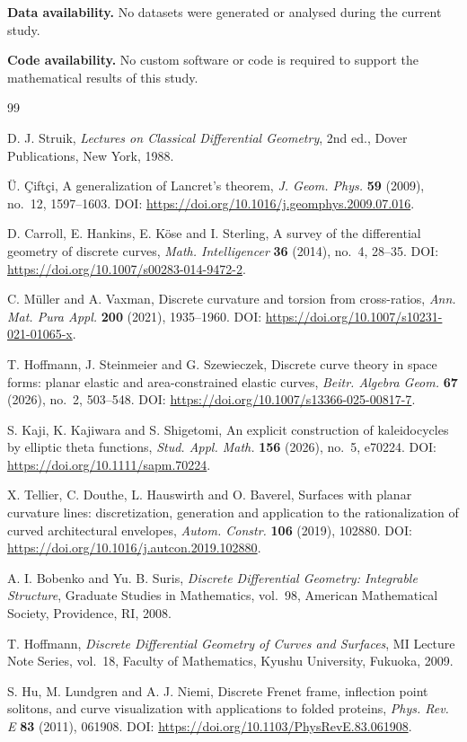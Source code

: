 \documentclass[10pt,a4paper]{amsart}
\theoremstyle{definition}
\theoremstyle{remark}
\numberwithin{equation}{section}
\begin{document}
\medskip
\noindent\textbf{Data availability.}
No datasets were generated or analysed during the current study.

\medskip
\noindent\textbf{Code availability.}
No custom software or code is required to support the mathematical results of this study.

\bigskip
\begin{sloppypar}
\begin{thebibliography}{99}

D. J. Struik,
\emph{Lectures on Classical Differential Geometry}, 2nd ed.,
Dover Publications, New York, 1988.

\"U. \c{C}ift\c{c}i,
A generalization of Lancret's theorem,
\emph{J. Geom. Phys.} \textbf{59} (2009), no.~12, 1597--1603.
DOI: \url{https://doi.org/10.1016/j.geomphys.2009.07.016}.

D. Carroll, E. Hankins, E. K\"ose and I. Sterling,
A survey of the differential geometry of discrete curves,
\emph{Math. Intelligencer} \textbf{36} (2014), no.~4, 28--35.
DOI: \url{https://doi.org/10.1007/s00283-014-9472-2}.

C. M\"uller and A. Vaxman,
Discrete curvature and torsion from cross-ratios,
\emph{Ann. Mat. Pura Appl.} \textbf{200} (2021), 1935--1960.
DOI: \url{https://doi.org/10.1007/s10231-021-01065-x}.

T. Hoffmann, J. Steinmeier and G. Szewieczek,
Discrete curve theory in space forms: planar elastic and
area-constrained elastic curves,
\emph{Beitr. Algebra Geom.} \textbf{67} (2026), no.~2, 503--548.
DOI: \url{https://doi.org/10.1007/s13366-025-00817-7}.

S. Kaji, K. Kajiwara and S. Shigetomi,
An explicit construction of kaleidocycles by elliptic theta functions,
\emph{Stud. Appl. Math.} \textbf{156} (2026), no.~5, e70224.
DOI: \url{https://doi.org/10.1111/sapm.70224}.

X. Tellier, C. Douthe, L. Hauswirth and O. Baverel,
Surfaces with planar curvature lines: discretization, generation and
application to the rationalization of curved architectural envelopes,
\emph{Autom. Constr.} \textbf{106} (2019), 102880.
DOI: \url{https://doi.org/10.1016/j.autcon.2019.102880}.

A. I. Bobenko and Yu. B. Suris,
\emph{Discrete Differential Geometry: Integrable Structure},
Graduate Studies in Mathematics, vol.~98, American Mathematical Society,
Providence, RI, 2008.

T. Hoffmann,
\emph{Discrete Differential Geometry of Curves and Surfaces},
MI Lecture Note Series, vol.~18, Faculty of Mathematics, Kyushu University,
Fukuoka, 2009.

S. Hu, M. Lundgren and A. J. Niemi,
Discrete Frenet frame, inflection point solitons, and curve visualization with applications to folded proteins,
\emph{Phys. Rev. E} \textbf{83} (2011), 061908.
DOI: \url{https://doi.org/10.1103/PhysRevE.83.061908}.

\end{thebibliography}
\end{sloppypar}
\end{document}
